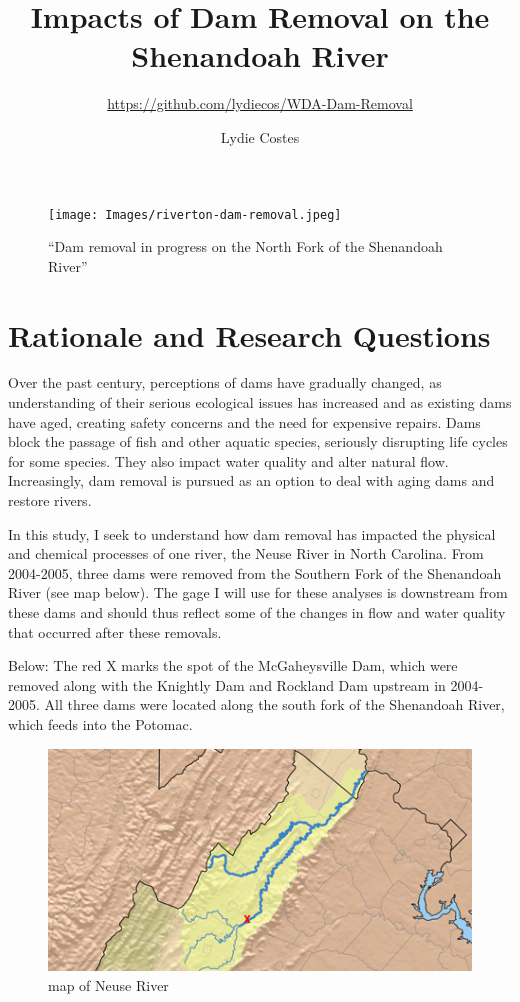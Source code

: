 \documentclass[
  12pt,
]{article}
\title{Impacts of Dam Removal on the Shenandoah River}
\subtitle{\url{https://github.com/lydiecos/WDA-Dam-Removal}}
\author{Lydie Costes}
\date{}
\begin{document}
\maketitle

\begin{figure}
\centering
\texttt{[image: Images/riverton-dam-removal.jpeg]}
\caption{``Dam removal in progress on the North Fork of the Shenandoah
River''}
\end{figure}

\newpage
\tableofcontents 
\newpage
\listoftables 
\listoffigures 
\newpage

\hypertarget{rationale-and-research-questions}{%
\section{Rationale and Research
Questions}\label{rationale-and-research-questions}}

Over the past century, perceptions of dams have gradually changed, as
understanding of their serious ecological issues has increased and as
existing dams have aged, creating safety concerns and the need for
expensive repairs. Dams block the passage of fish and other aquatic
species, seriously disrupting life cycles for some species. They also
impact water quality and alter natural flow. Increasingly, dam removal
is pursued as an option to deal with aging dams and restore rivers.

In this study, I seek to understand how dam removal has impacted the
physical and chemical processes of one river, the Neuse River in North
Carolina. From 2004-2005, three dams were removed from the Southern Fork
of the Shenandoah River (see map below). The gage I will use for these
analyses is downstream from these dams and should thus reflect some of
the changes in flow and water quality that occurred after these
removals.

Below: The red X marks the spot of the McGaheysville Dam, which were
removed along with the Knightly Dam and Rockland Dam upstream in
2004-2005. All three dams were located along the south fork of the
Shenandoah River, which feeds into the Potomac.

\begin{figure}
\centering
\includegraphics{../Figures-and-Maps/mcgaheysvilledam.png}
\caption{map of Neuse River}
\end{figure}
\end{document}
